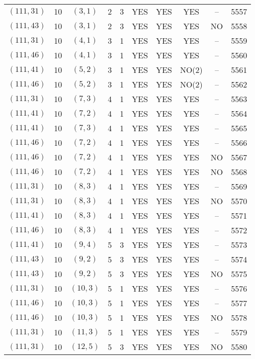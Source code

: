 \begin{longtable}{|c|c|c|c|c|c|c|c|c|c|}
$(111, 31)$ & 10 & $(3, 1)$ & 2 & 3 & YES & YES & YES & -- & 5557\\
$(111, 43)$ & 10 & $(3, 1)$ & 2 & 3 & YES & YES & YES & NO & 5558\\
$(111, 31)$ & 10 & $(4, 1)$ & 3 & 1 & YES & YES & YES & -- & 5559\\
$(111, 46)$ & 10 & $(4, 1)$ & 3 & 1 & YES & YES & YES & -- & 5560\\
$(111, 41)$ & 10 & $(5, 2)$ & 3 & 1 & YES & YES & NO(2) & -- & 5561\\
$(111, 46)$ & 10 & $(5, 2)$ & 3 & 1 & YES & YES & NO(2) & -- & 5562\\
$(111, 31)$ & 10 & $(7, 3)$ & 4 & 1 & YES & YES & YES & -- & 5563\\
$(111, 41)$ & 10 & $(7, 2)$ & 4 & 1 & YES & YES & YES & -- & 5564\\
$(111, 41)$ & 10 & $(7, 3)$ & 4 & 1 & YES & YES & YES & -- & 5565\\
$(111, 46)$ & 10 & $(7, 2)$ & 4 & 1 & YES & YES & YES & -- & 5566\\
$(111, 46)$ & 10 & $(7, 2)$ & 4 & 1 & YES & YES & YES & NO & 5567\\
$(111, 46)$ & 10 & $(7, 2)$ & 4 & 1 & YES & YES & YES & NO & 5568\\
$(111, 31)$ & 10 & $(8, 3)$ & 4 & 1 & YES & YES & YES & -- & 5569\\
$(111, 31)$ & 10 & $(8, 3)$ & 4 & 1 & YES & YES & YES & NO & 5570\\
$(111, 41)$ & 10 & $(8, 3)$ & 4 & 1 & YES & YES & YES & -- & 5571\\
$(111, 46)$ & 10 & $(8, 3)$ & 4 & 1 & YES & YES & YES & -- & 5572\\
$(111, 41)$ & 10 & $(9, 4)$ & 5 & 3 & YES & YES & YES & -- & 5573\\
$(111, 43)$ & 10 & $(9, 2)$ & 5 & 3 & YES & YES & YES & -- & 5574\\
$(111, 43)$ & 10 & $(9, 2)$ & 5 & 3 & YES & YES & YES & NO & 5575\\
$(111, 31)$ & 10 & $(10, 3)$ & 5 & 1 & YES & YES & YES & -- & 5576\\
$(111, 46)$ & 10 & $(10, 3)$ & 5 & 1 & YES & YES & YES & -- & 5577\\
$(111, 46)$ & 10 & $(10, 3)$ & 5 & 1 & YES & YES & YES & NO & 5578\\
$(111, 31)$ & 10 & $(11, 3)$ & 5 & 1 & YES & YES & YES & -- & 5579\\
$(111, 31)$ & 10 & $(12, 5)$ & 5 & 3 & YES & YES & YES & NO & 5580\\

\end{longtable}

